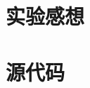 \documentclass{article}
\begin{document}
\section{实验感想}

\newpage
\appendix
\section{源代码}
\end{document}

